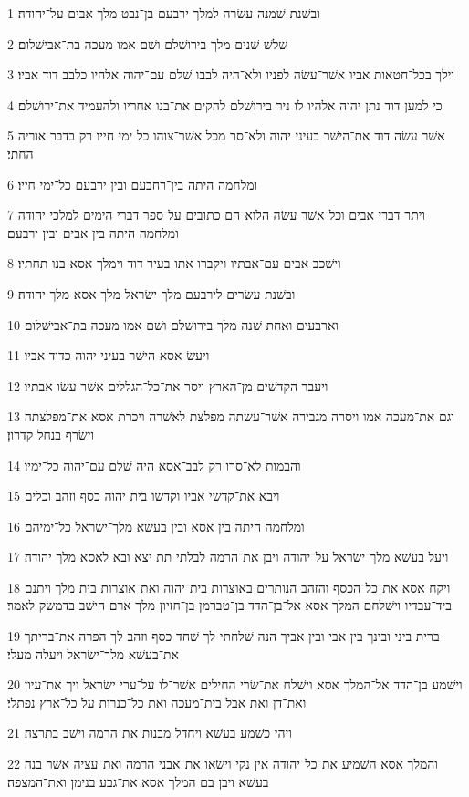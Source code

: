 \par 1 ובשׁנת שׁמנה עשׂרה למלך ירבעם בן־נבט מלך אבים על־יהודה׃
\par 2 שׁלשׁ שׁנים מלך בירושׁלם ושׁם אמו מעכה בת־אבישׁלום׃
\par 3 וילך בכל־חטאות אביו אשׁר־עשׂה לפניו ולא־היה לבבו שׁלם עם־יהוה אלהיו כלבב דוד אביו׃
\par 4 כי למען דוד נתן יהוה אלהיו לו ניר בירושׁלם להקים את־בנו אחריו ולהעמיד את־ירושׁלם׃
\par 5 אשׁר עשׂה דוד את־הישׁר בעיני יהוה ולא־סר מכל אשׁר־צוהו כל ימי חייו רק בדבר אוריה החתי׃
\par 6 ומלחמה היתה בין־רחבעם ובין ירבעם כל־ימי חייו׃
\par 7 ויתר דברי אבים וכל־אשׁר עשׂה הלוא־הם כתובים על־ספר דברי הימים למלכי יהודה ומלחמה היתה בין אבים ובין ירבעם׃
\par 8 וישׁכב אבים עם־אבתיו ויקברו אתו בעיר דוד וימלך אסא בנו תחתיו׃
\par 9 ובשׁנת עשׂרים לירבעם מלך ישׂראל מלך אסא מלך יהודה׃
\par 10 וארבעים ואחת שׁנה מלך בירושׁלם ושׁם אמו מעכה בת־אבישׁלום׃
\par 11 ויעשׂ אסא הישׁר בעיני יהוה כדוד אביו׃
\par 12 ויעבר הקדשׁים מן־הארץ ויסר את־כל־הגללים אשׁר עשׂו אבתיו׃
\par 13 וגם את־מעכה אמו ויסרה מגבירה אשׁר־עשׂתה מפלצת לאשׁרה ויכרת אסא את־מפלצתה וישׂרף בנחל קדרון׃
\par 14 והבמות לא־סרו רק לבב־אסא היה שׁלם עם־יהוה כל־ימיו׃
\par 15 ויבא את־קדשׁי אביו וקדשׁו בית יהוה כסף וזהב וכלים׃
\par 16 ומלחמה היתה בין אסא ובין בעשׁא מלך־ישׂראל כל־ימיהם׃
\par 17 ויעל בעשׁא מלך־ישׂראל על־יהודה ויבן את־הרמה לבלתי תת יצא ובא לאסא מלך יהודה׃
\par 18 ויקח אסא את־כל־הכסף והזהב הנותרים באוצרות בית־יהוה ואת־אוצרות בית מלך ויתנם ביד־עבדיו וישׁלחם המלך אסא אל־בן־הדד בן־טברמן בן־חזיון מלך ארם הישׁב בדמשׂק לאמר׃
\par 19 ברית ביני ובינך בין אבי ובין אביך הנה שׁלחתי לך שׁחד כסף וזהב לך הפרה את־בריתך את־בעשׁא מלך־ישׂראל ויעלה מעלי׃
\par 20 וישׁמע בן־הדד אל־המלך אסא וישׁלח את־שׂרי החילים אשׁר־לו על־ערי ישׂראל ויך את־עיון ואת־דן ואת אבל בית־מעכה ואת כל־כנרות על כל־ארץ נפתלי׃
\par 21 ויהי כשׁמע בעשׁא ויחדל מבנות את־הרמה וישׁב בתרצה׃
\par 22 והמלך אסא השׁמיע את־כל־יהודה אין נקי וישׂאו את־אבני הרמה ואת־עציה אשׁר בנה בעשׁא ויבן בם המלך אסא את־גבע בנימן ואת־המצפה׃
